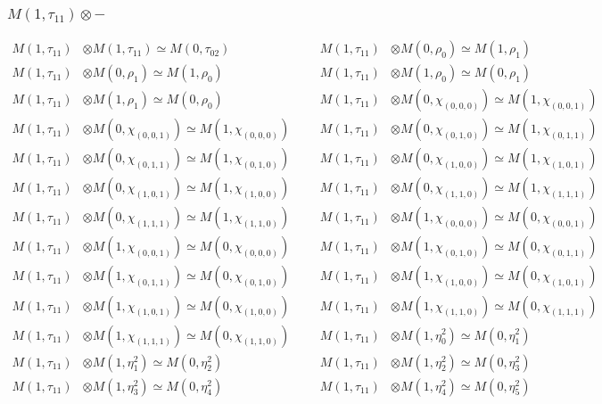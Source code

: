 \subsubsection{$ M(1,\tau_{11})\otimes -$}
\begin{align*}
M(1,\tau_{11}) &\otimes M(1,\tau_{11}) \simeq M(0,\tau_{02}) &&& M(1,\tau_{11}) &\otimes M(0,\rho_{0}) \simeq M(1,\rho_{1})\\
M(1,\tau_{11}) &\otimes M(0,\rho_{1}) \simeq M(1,\rho_{0}) &&& M(1,\tau_{11}) &\otimes M(1,\rho_{0}) \simeq M(0,\rho_{1})\\
M(1,\tau_{11}) &\otimes M(1,\rho_{1}) \simeq M(0,\rho_{0}) &&& M(1,\tau_{11}) &\otimes M(0,\chi_{(0,0,0)}) \simeq M(1,\chi_{(0,0,1)})\\
M(1,\tau_{11}) &\otimes M(0,\chi_{(0,0,1)}) \simeq M(1,\chi_{(0,0,0)}) &&& M(1,\tau_{11}) &\otimes M(0,\chi_{(0,1,0)}) \simeq M(1,\chi_{(0,1,1)})\\
M(1,\tau_{11}) &\otimes M(0,\chi_{(0,1,1)}) \simeq M(1,\chi_{(0,1,0)}) &&& M(1,\tau_{11}) &\otimes M(0,\chi_{(1,0,0)}) \simeq M(1,\chi_{(1,0,1)})\\
M(1,\tau_{11}) &\otimes M(0,\chi_{(1,0,1)}) \simeq M(1,\chi_{(1,0,0)}) &&& M(1,\tau_{11}) &\otimes M(0,\chi_{(1,1,0)}) \simeq M(1,\chi_{(1,1,1)})\\
M(1,\tau_{11}) &\otimes M(0,\chi_{(1,1,1)}) \simeq M(1,\chi_{(1,1,0)}) &&& M(1,\tau_{11}) &\otimes M(1,\chi_{(0,0,0)}) \simeq M(0,\chi_{(0,0,1)})\\
M(1,\tau_{11}) &\otimes M(1,\chi_{(0,0,1)}) \simeq M(0,\chi_{(0,0,0)}) &&& M(1,\tau_{11}) &\otimes M(1,\chi_{(0,1,0)}) \simeq M(0,\chi_{(0,1,1)})\\
M(1,\tau_{11}) &\otimes M(1,\chi_{(0,1,1)}) \simeq M(0,\chi_{(0,1,0)}) &&& M(1,\tau_{11}) &\otimes M(1,\chi_{(1,0,0)}) \simeq M(0,\chi_{(1,0,1)})\\
M(1,\tau_{11}) &\otimes M(1,\chi_{(1,0,1)}) \simeq M(0,\chi_{(1,0,0)}) &&& M(1,\tau_{11}) &\otimes M(1,\chi_{(1,1,0)}) \simeq M(0,\chi_{(1,1,1)})\\
M(1,\tau_{11}) &\otimes M(1,\chi_{(1,1,1)}) \simeq M(0,\chi_{(1,1,0)}) &&& M(1,\tau_{11}) &\otimes M(1,\eta^{2}_{0}) \simeq M(0,\eta^{2}_{1})\\
M(1,\tau_{11}) &\otimes M(1,\eta^{2}_{1}) \simeq M(0,\eta^{2}_{2}) &&& M(1,\tau_{11}) &\otimes M(1,\eta^{2}_{2}) \simeq M(0,\eta^{2}_{3})\\
M(1,\tau_{11}) &\otimes M(1,\eta^{2}_{3}) \simeq M(0,\eta^{2}_{4}) &&& M(1,\tau_{11}) &\otimes M(1,\eta^{2}_{4}) \simeq M(0,\eta^{2}_{5})\\

\end{align*}
